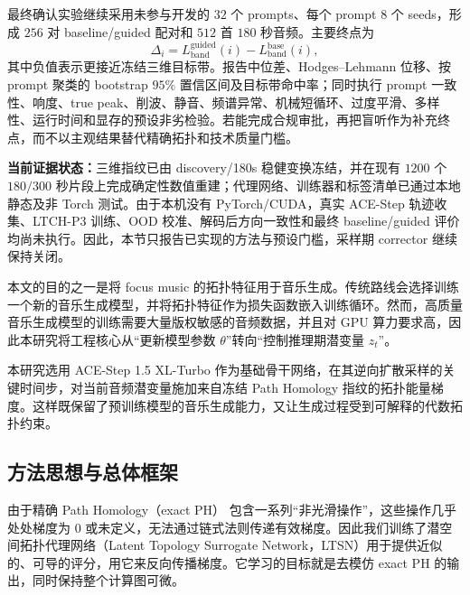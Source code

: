 \documentclass{article}
\begin{document}
最终确认实验继续采用未参与开发的 $32$ 个 prompts、每个 prompt $8$ 个 seeds，形成 $256$ 对 baseline/guided 配对和 $512$ 首 $180$ 秒音频。主要终点为
\begin{equation}
\Delta_i=L_{\mathrm{band}}^{\mathrm{guided}}(i)
-L_{\mathrm{band}}^{\mathrm{base}}(i),
\end{equation}
其中负值表示更接近冻结三维目标带。报告中位差、Hodges--Lehmann 位移、按 prompt 聚类的 bootstrap $95\%$ 置信区间及目标带命中率；同时执行 prompt 一致性、响度、true peak、削波、静音、频谱异常、机械短循环、过度平滑、多样性、运行时间和显存的预设非劣检验。若能完成合规审批，再把盲听作为补充终点，而不以主观结果替代精确拓扑和技术质量门槛。

\begin{tcolorbox}[colback=yellow!20,colframe=yellow!60!black,boxrule=0.5pt,arc=6pt,left=6pt,right=6pt,top=4pt,bottom=4pt]
\textbf{当前证据状态：}三维指纹已由 discovery/180s 稳健变换冻结，并在现有 $1200$ 个 $180/300$ 秒片段上完成确定性数值重建；代理网络、训练器和标签清单已通过本地静态及非 Torch 测试。由于本机没有 PyTorch/CUDA，真实 ACE-Step 轨迹收集、LTCH-P3 训练、OOD 校准、解码后方向一致性和最终 baseline/guided 评价均尚未执行。因此，本节只报告已实现的方法与预设门槛，采样期 corrector 继续保持关闭。
\end{tcolorbox}

\iffalse %

本文的目的之一是将 focus music 的拓扑特征用于音乐生成。传统路线会选择训练一个新的音乐生成模型，并将拓扑特征作为损失函数嵌入训练循环。然而，高质量音乐生成模型的训练需要大量版权敏感的音频数据，并且对 GPU 算力要求高，因此本研究将工程核心从``更新模型参数 $\theta$''转向``控制推理期潜变量 $z_t$''。

本研究选用 ACE-Step 1.5 XL-Turbo 作为基础骨干网络，在其逆向扩散采样的关键时间步，对当前音频潜变量施加来自冻结 Path Homology 指纹的拓扑能量梯度。这样既保留了预训练模型的音乐生成能力，又让生成过程受到可解释的代数拓扑约束。

\subsection{方法思想与总体框架}

由于精确 Path Homology（exact PH） 包含一系列``非光滑操作''，这些操作几乎处处梯度为 $0$ 或未定义，无法通过链式法则传递有效梯度。因此我们训练了潜空间拓扑代理网络（Latent Topology Surrogate Network，LTSN）用于提供近似的、可导的评分，用它来反向传播梯度。它学习的目标就是去模仿 exact PH 的输出，同时保持整个计算图可微。
\end{document}
